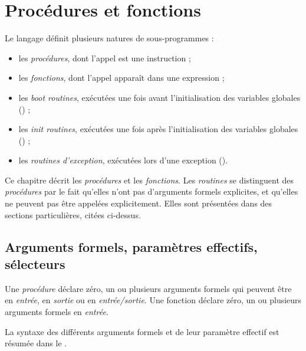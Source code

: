 




\chapter{Procédures et fonctions}

Le langage définit plusieurs natures de sous-programmes :
\begin{itemize}
  \item les \emph{procédures}, dont l'appel est une instruction ;
  \item les \emph{fonctions}, dont l'appel apparaît dans une expression ;
  \item les \emph{boot routines}, exécutées une fois avant l'initialisation des variables globales () ;
  \item les \emph{init routines}, exécutées une fois après l'initialisation des variables globales () ;
  \item les \emph{routines d'exception}, exécutées lors d'une exception ().
\end{itemize}

Ce chapitre décrit les \emph{procédures} et les \emph{fonctions}. Les \emph{routines} se distinguent des \emph{procédures} par le fait qu'elles n'ont pas d'arguments formels explicites, et qu'elles ne peuvent pas être appelées explicitement. Elles sont présentées dans des sections particulières, citées ci-dessus.

\section{Arguments formels, paramètres effectifs, sélecteurs}

Une \emph{procédure} déclare zéro, un ou plusieurs arguments formels qui peuvent être en \emph{entrée}, en \emph{sortie} ou en \emph{entrée/sortie}. Une fonction déclare zéro, un ou plusieurs arguments formels en \emph{entrée}.

La syntaxe des différents arguments formels et de leur paramètre effectif est résumée dans le .


